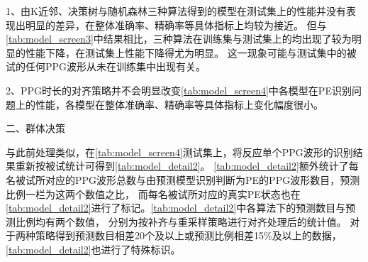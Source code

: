 1、由K近邻、决策树与随机森林三种算法得到的模型在测试集上的性能并没有表现出明显的差异，在整体准确率、精确率等具体指标上均较为接近。
但与\autoref{tab:model_screen3}中结果相比，三种算法在训练集与测试集上的均出现了较为明显的性能下降，在测试集上性能下降得尤为明显。
这一现象可能与测试集中的被试的任何PPG波形从未在训练集中出现有关。

2、PPG时长的对齐策略并不会明显改变\autoref{tab:model_screen4}中各模型在PE识别问题上的性能，各模型在整体准确率、精确率等具体指标上变化幅度很小。

二、群体决策

与此前处理类似，在\autoref{tab:model_screen4}测试集上，将反应单个PPG波形的识别结果重新按被试统计可得到\autoref{tab:model_detail2}。
\autoref{tab:model_detail2}额外统计了每名被试所对应的PPG波形总数与由预测模型识别判断为PE的PPG波形数目，预测比例一栏为这两个数值之比，
而每名被试所对应的真实PE状态也在\autoref{tab:model_detail2}进行了标记。\autoref{tab:model_detail2}中各算法下的预测数目与预测比例均有两个数值，
分别为按补齐与重采样策略进行对齐处理后的统计值。
对于两种策略得到预测数目相差20个及以上或预测比例相差15\%及以上的数据，\autoref{tab:model_detail2}也进行了特殊标识。

